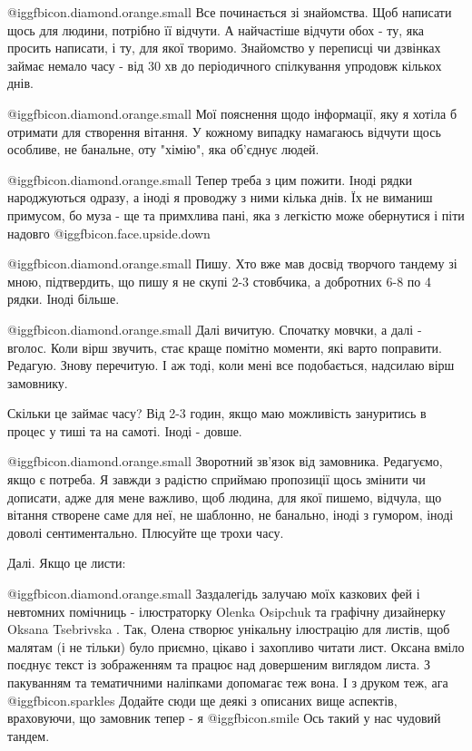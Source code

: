  @igg{fbicon.diamond.orange.small}  Все починається зі знайомства. Щоб написати щось для людини, потрібно її
відчути. А найчастіше  відчути обох - ту, яка просить написати, і ту, для якої
творимо. Знайомство у переписці чи дзвінках займає немало часу - від 30 хв до
періодичного спілкування упродовж кількох днів. 

 @igg{fbicon.diamond.orange.small} Мої пояснення щодо інформації, яку я хотіла б отримати для створення вітання.
У кожному випадку намагаюсь відчути щось особливе, не банальне, оту "хімію",
яка об'єднує людей. 

 @igg{fbicon.diamond.orange.small} Тепер треба з цим пожити. Іноді рядки
 народжуються одразу, а іноді я проводжу з ними кілька днів. Їх не виманиш
 примусом, бо муза - ще та примхлива пані, яка з легкістю може обернутися і
 піти надовго @igg{fbicon.face.upside.down} 

 @igg{fbicon.diamond.orange.small} Пишу. Хто вже мав досвід творчого тандему зі мною, підтвердить, що пишу я не
скупі 2-3 стовбчика, а добротних 6-8 по 4 рядки. Іноді більше. 

 @igg{fbicon.diamond.orange.small} Далі вичитую. Спочатку мовчки, а далі - вголос. Коли вірш звучить, стає краще
помітно моменти, які варто поправити. Редагую. Знову перечитую. І аж тоді, коли
мені все подобається, надсилаю вірш замовнику.

Скільки це займає часу? Від 2-3 годин, якщо маю можливість зануритись в процес
у тиші та на самоті. Іноді - довше. 

 @igg{fbicon.diamond.orange.small}  Зворотний зв'язок від замовника. Редагуємо, якщо є потреба. Я завжди з
радістю сприймаю пропозиції щось змінити чи дописати, адже для мене важливо,
щоб людина, для якої пишемо, відчула, що вітання створене саме для неї, не
шаблонно, не банально, іноді з гумором, іноді доволі сентиментально. Плюсуйте
ще трохи часу. 

Далі. Якщо це листи:

 @igg{fbicon.diamond.orange.small}  Заздалегідь залучаю моїх казкових фей і невтомних помічниць - ілюстраторку
Olenka Osipchuk  та графічну дизайнерку Oksana Tsebrivska . Так, Олена створює
унікальну ілюстрацію для листів, щоб малятам (і не тільки) було приємно, цікаво
і захопливо читати лист. Оксана вміло поєднує текст із зображенням та працює
над довершеним виглядом листа. З пакуванням та тематичними наліпками допомагає
теж вона. І з друком теж, ага @igg{fbicon.sparkles}  Додайте сюди ще деякі з описаних вище аспектів,
враховуючи, що замовник тепер - я @igg{fbicon.smile}  Ось такий у нас чудовий тандем. 

